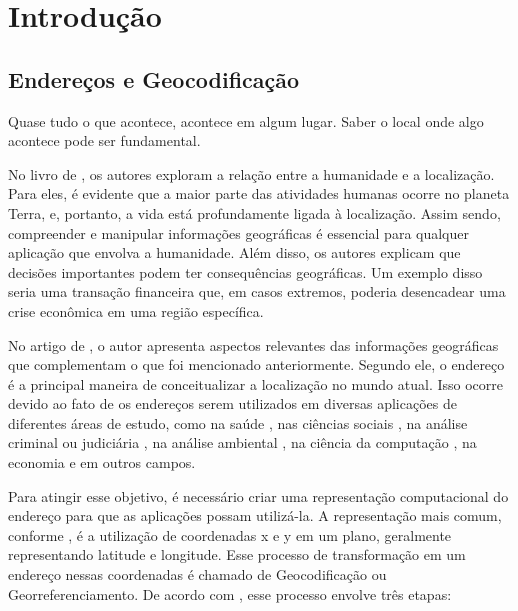 \chapter{Introdução} \label{Introducao}

\section{Endereços e Geocodificação}
 
\epigraph{Quase tudo o que acontece, acontece em algum lugar. Saber o local onde algo acontece pode ser fundamental.}{\cite{longley2013}}

No livro de \cite{longley2013}, os autores exploram a relação entre a humanidade e a localização. Para eles, é evidente que a maior parte das atividades humanas ocorre no planeta Terra, e, portanto, a vida está profundamente ligada à localização. Assim sendo, compreender e manipular informações geográficas é essencial para qualquer aplicação que envolva a humanidade. Além disso, os autores explicam que decisões importantes podem ter consequências geográficas. Um exemplo disso seria uma transação financeira que, em casos extremos, poderia desencadear uma crise econômica em uma região específica.

No artigo de \cite{Zamberg2009}, o autor apresenta aspectos relevantes das informações geográficas que complementam o que foi mencionado anteriormente. Segundo ele, o endereço é a principal maneira de conceitualizar a localização no mundo atual. Isso ocorre devido ao fato de os endereços serem utilizados em diversas aplicações de diferentes áreas de estudo, como na saúde \cite{AmericaJournal2001, Kypri2009, Mazumdar2008}, nas ciências sociais \cite{Chow2011}, na análise criminal ou judiciária \cite{Olligschlaeger1998}, na análise ambiental \cite{Gilboa2006}, na ciência da computação \cite{Zamberg2009}, na economia \cite{Whitsel2006} e em outros campos.

Para atingir esse objetivo, é necessário criar uma representação computacional do endereço para que as aplicações possam utilizá-la. A representação mais comum, conforme \cite{Zamberg2009}, é a utilização de coordenadas x e y em um plano, geralmente representando latitude e longitude. Esse processo de transformação em um endereço nessas coordenadas é chamado de Geocodificação ou Georreferenciamento. De acordo com \cite{Zamberg2009}, esse processo envolve três etapas:

